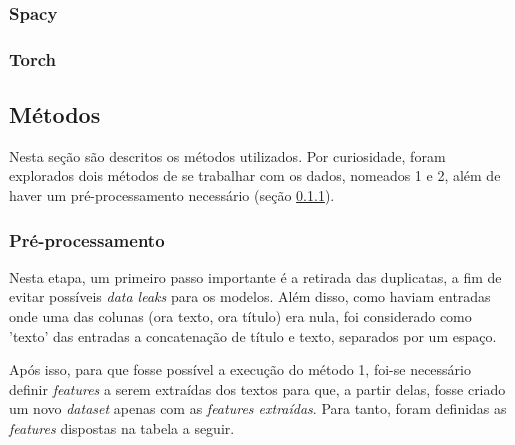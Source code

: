 \documentclass[12pt]{article}
\begin{document}
\subsubsection{Spacy}

\subsubsection{Torch}

\subsection{Métodos} \label{sec:metodos}

Nesta seção são descritos os métodos utilizados. Por curiosidade, foram explorados dois métodos de se trabalhar com os dados, nomeados 1 e 2, além de haver um pré-processamento necessário (seção \ref{sec:preproc}).

\subsubsection{Pré-processamento} \label{sec:preproc}

Nesta etapa, um primeiro passo importante é a retirada das duplicatas, a fim de evitar possíveis \textit{data leaks} para os modelos. Além disso, como haviam entradas onde uma das colunas (ora texto, ora título) era nula, foi considerado como 'texto' das entradas a concatenação de título e texto, separados por um espaço.

Após isso, para que fosse possível a execução do método 1, foi-se necessário definir \textit{features} a serem extraídas dos textos para que, a partir delas, fosse criado um novo \textit{dataset} apenas com as \textit{features extraídas}. Para tanto, foram definidas as \textit{features} dispostas na tabela a seguir.
\end{document}
